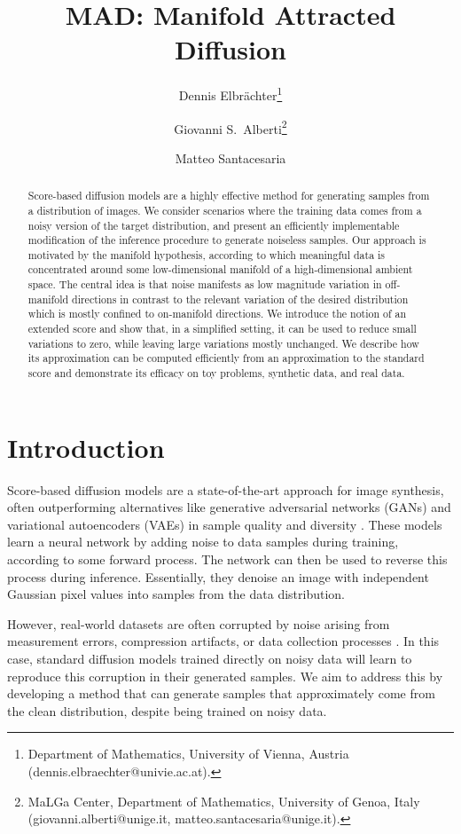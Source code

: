 \documentclass{article}
\title{MAD: Manifold Attracted Diffusion}
\author{ Dennis Elbrächter\thanks{Department of Mathematics, University of Vienna,
Austria (dennis.elbraechter@univie.ac.at).} \and Giovanni S.~Alberti\footnotemark[2]\thanks{MaLGa Center, Department of Mathematics, University of Genoa, Italy (giovanni.alberti@unige.it, matteo.santacesaria@unige.it).} \and Matteo Santacesaria\footnotemark[2]}
\theoremstyle{plain}
\theoremstyle{definition}
\theoremstyle{remark}
\begin{document}
\maketitle


\begin{abstract}
Score-based diffusion models are a highly effective method for generating samples from a distribution of images. We consider scenarios where the training data comes from a noisy version of the target distribution, and present an efficiently implementable modification of the inference procedure to generate noiseless samples.
Our approach is motivated by the manifold hypothesis, according to which meaningful data is concentrated around some low-dimensional manifold of a high-dimensional ambient space. The central idea is that noise manifests as low magnitude variation in off-manifold directions in contrast to the relevant variation of the desired distribution which is mostly confined to on-manifold directions. We introduce the notion of an extended score and show that, in a simplified setting, it can be used to reduce small variations to zero, while leaving large variations mostly unchanged. We describe how its approximation can be computed efficiently from an approximation to the standard score and demonstrate its efficacy on toy problems, synthetic data, and real data. 
\end{abstract}

\section{Introduction}



Score-based diffusion models are a state-of-the-art approach for image synthesis, often outperforming alternatives like generative adversarial networks (GANs) and variational autoencoders (VAEs) in sample quality and diversity \citep{ho2020denoising,song2020score}. These models learn a neural network by adding noise to data samples during training, according to some forward process. The network can then be used to reverse this process during inference. Essentially, they denoise an image with independent Gaussian pixel values into samples from the data distribution.

However, real-world datasets are often corrupted by noise arising from measurement errors, compression artifacts, or data collection processes \citep{GUPTA2019466,Brummer_2019_CVPR_Workshops}. In this case, standard diffusion models trained directly on noisy data will learn to reproduce this corruption in their generated samples. We aim to address this by developing a method that can generate samples that  approximately come from the clean distribution, despite being trained on noisy data. 
\end{document}
